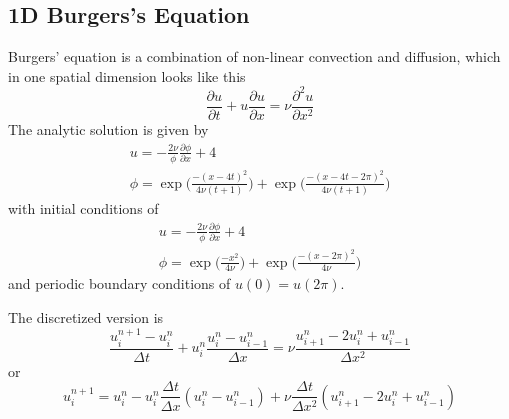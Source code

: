 \documentclass[../../../main.tex]{subfiles}
\begin{document}
\subsection{1D Burgers's Equation}
Burgers' equation is a combination of non-linear convection and diffusion, which in one spatial dimension looks like this
\begin{equation*}
    \frac{\partial u}{\partial t} + u \frac{\partial u}{\partial x} = \nu \frac{\partial ^2u}{\partial x^2}
\end{equation*}
The analytic solution is given by 
\begin{gather*}
    u= -\frac{2 \nu}{\phi} \frac{\partial \phi}{\partial x} + 4 \\
    \phi = \exp \bigg(\frac{-(x-4t)^2}{4 \nu (t+1)} \bigg) + \exp \bigg(\frac{-(x-4t -2 \pi)^2}{4 \nu(t+1)} \bigg)
\end{gather*}
with initial conditions of 
\begin{gather*}
    u = -\frac{2 \nu}{\phi} \frac{\partial \phi}{\partial x} + 4 \\
    \phi = \exp \bigg(\frac{-x^2}{4 \nu} \bigg) + \exp \bigg(\frac{-(x-2 \pi)^2}{4 \nu} \bigg)
\end{gather*}
and periodic boundary conditions of $u(0)=u(2\pi)$.

The discretized version is 
\begin{equation*}
    \frac{u_i^{n+1}-u_i^n}{\Delta t} + u_i^n \frac{u_i^n - u_{i-1}^n}{\Delta x} = \nu \frac{u_{i+1}^n - 2u_i^n + u_{i-1}^n}{\Delta x^2}
\end{equation*}
or 
\begin{equation*}
    u_i^{n+1} = u_i^n - u_i^n \frac{\Delta t}{\Delta x} (u_i^n - u_{i-1}^n) + \nu \frac{\Delta t}{\Delta x^2}(u_{i+1}^n - 2u_i^n + u_{i-1}^n)
\end{equation*}
\end{document}
